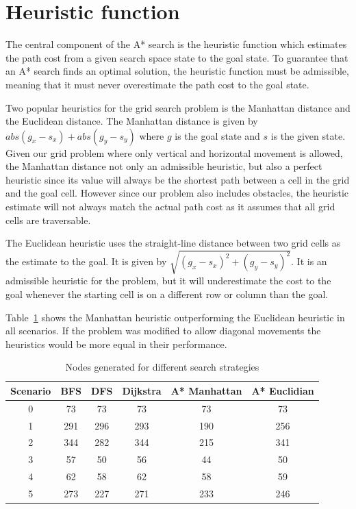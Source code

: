 \section*{Heuristic function}

The central component of the A* search is the heuristic function which estimates the path cost from a given search space state to the goal state. To guarantee that an A* search finds an optimal solution, the heuristic function must be admissible, meaning that it must never overestimate the path cost to the goal state.

Two popular heuristics for the grid search problem is the Manhattan distance and the Euclidean distance. The Manhattan distance is given by $\textit{abs}(g_x - s_x) + \textit{abs}(g_y - s_y)$ where $g$ is the goal state and $s$ is the given state. Given our grid problem where only vertical and horizontal movement is allowed, the Manhattan distance not only an admissible heuristic, but also a perfect heuristic since its value will always be the shortest path between a cell in the grid and the goal cell. However since our problem also includes obstacles, the heuristic estimate will not always match the actual path cost as it assumes that all grid cells are traversable.

The Euclidean heuristic uses the straight-line distance between two grid cells as the estimate to the goal. It is given by $\sqrt{(g_x - s_x)^2 + (g_y - s_y)^2}$. It is an admissible heuristic for the problem, but it will underestimate the cost to the goal whenever the starting cell is on a different row or column than the goal.

Table~\ref{table:vi_generated_nodes} shows the Manhattan heuristic outperforming the Euclidean heuristic in all scenarios. If the problem was modified to allow diagonal movements the heuristics would be more equal in their performance.

\begin{table}
\centering
\begin{tabular}{c|ccccc}
Scenario & BFS & DFS & Dijkstra & A* Manhattan & A* Euclidian \\
\hline
0        &  73 &  73 &       73 &           73 &           73 \\
1        & 291 & 296 &      293 &          190 &          256 \\
2        & 344 & 282 &      344 &          215 &          341 \\
3        &  57 &  50 &       56 &           44 &           50 \\
4        &  62 &  58 &       62 &           58 &           59 \\
5        & 273 & 227 &      271 &          233 &          246 \\
\end{tabular}
\caption{Nodes generated for different search strategies}
\label{table:vi_generated_nodes}
\end{table}

